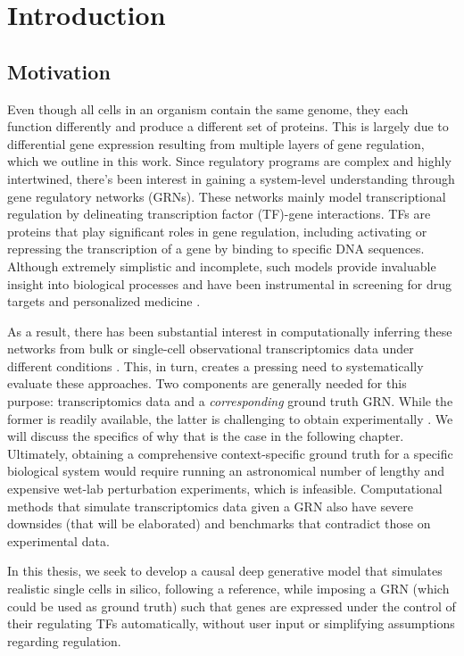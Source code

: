 \chapter{Introduction}
\section*{Motivation}
Even though all cells in an organism contain the same genome, they each function differently and produce a different set of proteins. This is largely due to differential gene expression resulting from multiple layers of gene regulation, which we outline in this work. Since regulatory programs are complex and highly intertwined, there’s been interest in gaining a system-level understanding through gene regulatory networks (GRNs). These networks mainly model transcriptional regulation by delineating transcription factor (TF)-gene interactions. TFs are proteins that play significant roles in gene regulation, including activating or repressing the transcription of a gene by binding to specific DNA sequences. Although extremely simplistic and incomplete, such models provide invaluable insight into biological processes \cite{emad2017epithelial, che2017dynamic} and have been instrumental in screening for drug targets and personalized medicine \cite{delgado2019computational, zhang2019differential}. 

As a result, there has been substantial interest in computationally inferring these networks from bulk or single-cell observational transcriptomics data under different conditions \cite{pratapa2020benchmarking}. This, in turn, creates a pressing need to systematically evaluate these approaches. Two components are generally needed for this purpose: transcriptomics data and a \textit{corresponding} ground truth GRN. While the former is readily available, the latter is challenging to obtain experimentally \cite{karamveer2024approaches, emmert2014gene}. We will discuss the specifics of why that is the case in the following chapter. Ultimately, obtaining a comprehensive context-specific ground truth for a specific biological system would require running an astronomical number of lengthy and expensive wet-lab perturbation experiments, which is infeasible. Computational methods that simulate transcriptomics data given a GRN also have severe downsides (that will be elaborated) and benchmarks that contradict those on experimental data. 

In this thesis, we seek to develop a causal deep generative model that simulates realistic single cells in silico, following a reference, while imposing a GRN (which could be used as ground truth) such that genes are expressed under the control of their regulating TFs automatically, without user input or simplifying assumptions regarding regulation.

